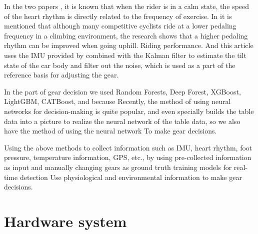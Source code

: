 \documentclass[conference]{IEEEtran}
\begin{document}
In the two papers \cite{coleman1920correlation}\cite{blain2009time}, it is known that when the rider is in a calm state, the speed of the heart rhythm is directly related to the frequency of exercise.
In \cite{bertucci2005effects} it is mentioned that although many competitive cyclists ride at a lower pedaling frequency in a climbing environment, the research \cite{patterson1990bicycle} shows that a higher pedaling rhythm can be improved when going uphill. Riding performance. And this article uses the IMU provided by \cite{kalman1960new} combined with the Kalman filter to estimate the tilt state of the car body and filter out the noise, which is used as a part of the reference basis for adjusting the gear.



In the part of gear decision we used Random Forests\cite{breiman2001random}, Deep Forest\cite{zhou2017deep}, XGBoost\cite{chen2016xgboost}, LightGBM\cite{ke2017lightgbm}, CATBoost\cite{dorogush2018catboost}, and because Recently, the method of using neural networks for decision-making is quite popular, and even \cite{sun2019supertml} specially builds the table data into a picture to realize the neural network of the table data, so we also have the method of using the neural network To make gear decisions.


Using the above methods to collect information such as IMU, heart rhythm, foot pressure, temperature information, GPS, etc., by using pre-collected information as input and manually changing gears as ground truth training models for real-time detection Use physiological and environmental information to make gear decisions.

\section{Hardware system}
\end{document}
